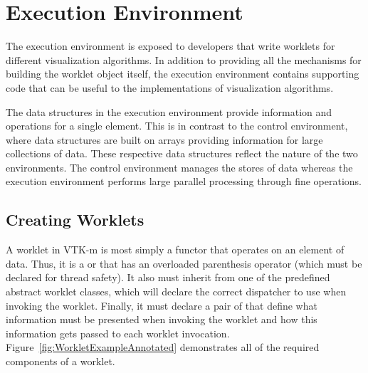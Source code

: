 
\chapter{Execution Environment}
\label{chap:ExecutionEnvironment}

The execution environment is exposed to developers that write worklets for
different visualization algorithms. In addition to providing all the
mechanisms for building the worklet object itself, the execution
environment contains supporting code that can be useful to the
implementations of visualization algorithms.

The data structures in the execution environment provide information and
operations for a single element. This is in contrast to the control
environment, where data structures are built on arrays providing
information for large collections of data. These respective data structures
reflect the nature of the two environments. The control environment manages
the stores of data whereas the execution environment performs large
parallel processing through fine operations.

\section{Creating Worklets}


A worklet in VTK-m is most simply a functor that operates on an element of
data. Thus, it is a  or  that has an
overloaded parenthesis operator (which must be declared 
for thread safety). It also must inherit from one of the predefined
abstract worklet classes, which will declare the correct dispatcher to use
when invoking the worklet. Finally, it must declare a pair of
 that define what information must be
presented when invoking the worklet and how this information gets passed to
each worklet invocation. Figure~\ref{fig:WorkletExampleAnnotated}
demonstrates all of the required components of a worklet.


